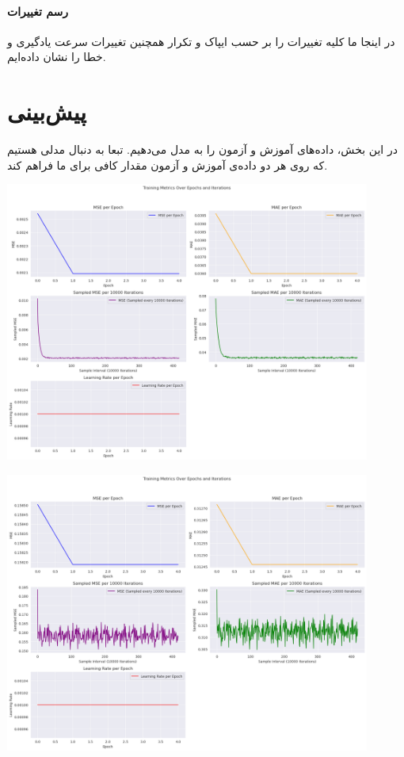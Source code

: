 \documentclass[11pt, a4paper, oneside]{book}
\begin{document}
\paragraph{رسم تغییرات‌}
در اینجا ما کلیه تغییرات را بر حسب ایپاک و تکرار همچنین تغییرات سرعت یادگیری و خطا را نشان داده‌ایم.
\section{پیش‌بینی}
در این بخش، داده‌های آموزش و آزمون را به مدل می‌دهیم. تبعا به دنبال مدلی هستیم که روی هر دو داده‌ی آموزش و آزمون مقدار
 کافی برای ما فراهم کند. 
\begin{center}
	\includegraphics[width=12cm]{./images/train_minmax.png}
\end{center}
\begin{center}
	\includegraphics[width=12cm]{./images/train_z.png}
\end{center}
\end{document}
